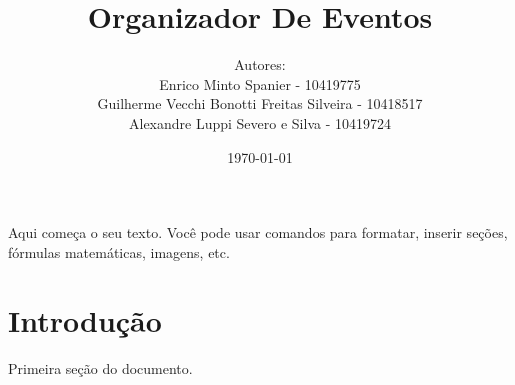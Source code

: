 \documentclass{article}  %
\title{Organizador De Eventos}
\author{Autores:\\Enrico Minto Spanier - 10419775 \\ Guilherme Vecchi Bonotti Freitas Silveira - 10418517 \\ Alexandre Luppi Severo e Silva - 10419724}
\date{\today}
\begin{document}
  
\maketitle  

Aqui começa o seu texto. Você pode usar comandos para formatar, inserir seções, fórmulas matemáticas, imagens, etc.  

\section{Introdução}  
Primeira seção do documento.  
\end{document}
